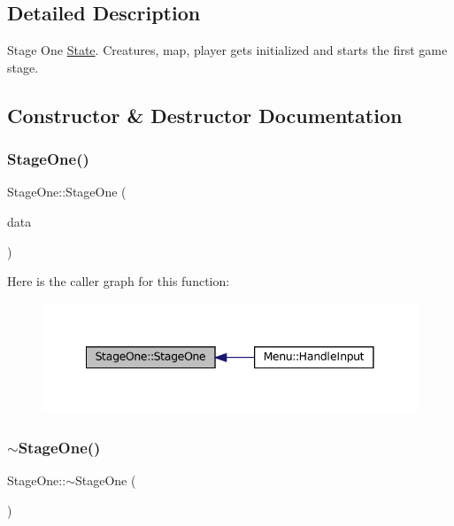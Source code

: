 \subsection{Detailed Description}
Stage One \mbox{\hyperlink{classState}{State}}. Creatures, map, player gets initialized and starts the first game stage. 

\subsection{Constructor \& Destructor Documentation}
\mbox{\label{classStageOne_a9eb31d0ce98795803b764b8836493008}} 
\subsubsection{\texorpdfstring{Stage\+One()}{StageOne()}}
{\footnotesize\ttfamily Stage\+One\+::\+Stage\+One (\begin{DoxyParamCaption}\item[{\mbox{\hyperlink{Game_8h_aff850703a7797c8bfee2f02906aec50c}{Game\+Data\+Ref}}}]{data }\end{DoxyParamCaption})}

Here is the caller graph for this function\+:\nopagebreak
\begin{figure}[H]
\begin{center}
\leavevmode
\includegraphics[width=341pt]{classStageOne_a9eb31d0ce98795803b764b8836493008_icgraph}
\end{center}
\end{figure}
\mbox{\label{classStageOne_a7761fca03288159de1772c59b31839d2}} 
\subsubsection{\texorpdfstring{$\sim$\+Stage\+One()}{~StageOne()}}
{\footnotesize\ttfamily Stage\+One\+::$\sim$\+Stage\+One (\begin{DoxyParamCaption}{ }\end{DoxyParamCaption})}



